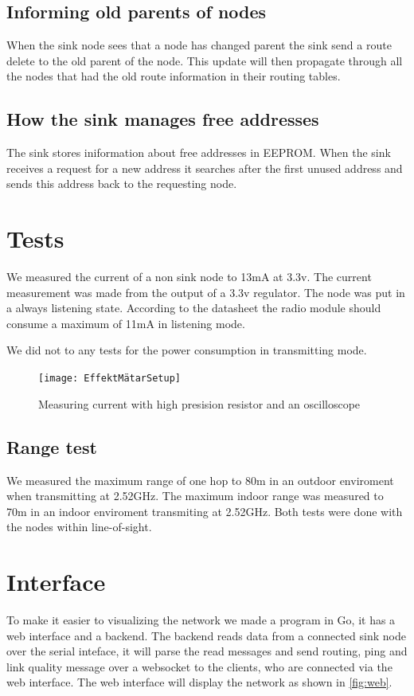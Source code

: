 \documentclass[a4paper,11pt]{article}
\begin{document}
\subsection{Informing old parents of nodes}
When the sink node sees that a node has changed parent the sink send a
route delete to the old parent of the node. This update will then
propagate through all the nodes that had the old route information in
their routing tables.

\subsection{How the sink manages free addresses}
The sink stores iniformation about free addresses in EEPROM.  When the
sink receives a request for a new address it searches after the first
unused address and sends this address back to the requesting node.

\section{Tests}
We measured the current of a non sink node to 13mA at 3.3v. The
current measurement was made from the output of a 3.3v regulator. The
node was put in a always listening state. According to the datasheet
the radio module should consume a maximum of 11mA in listening mode.

We did not to any tests for the power consumption in transmitting
mode.

\begin{figure}[H]
  \texttt{[image: EffektMätarSetup]}
  \caption{Measuring current with high presision resistor and an oscilloscope}
  \label{fig:Effekt}
\end{figure}

\subsection{Range test}
We measured the maximum range of one hop to 80m in an outdoor
enviroment when transmitting at 2.52GHz. The maximum indoor range was
measured to 70m in an indoor enviroment transmiting at 2.52GHz. Both
tests were done with the nodes within line-of-sight.

\section{Interface}

To make it easier to visualizing the network we made a program in Go,
it has a web interface and a backend. The backend reads data from a
connected sink node over the serial inteface, it will parse the read
messages and send routing, ping and link quality message over a
websocket to the clients, who are connected via the web interface. The
web interface will display the network as shown in \autoref{fig:web}.
\end{document}
